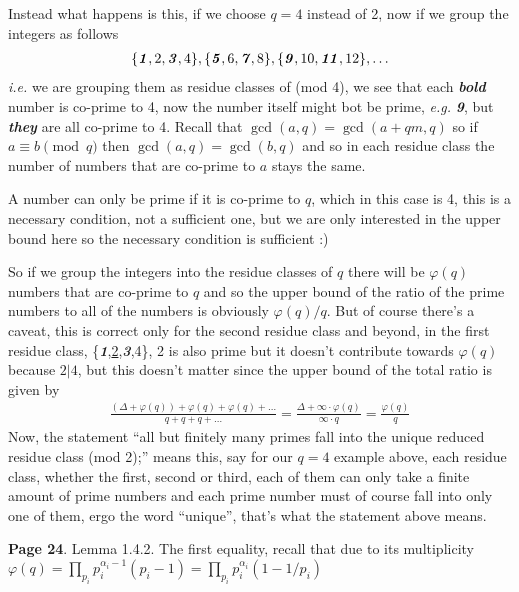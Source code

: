 \documentclass[aps,preprint,preprintnumbers,nofootinbib,showpacs,prd]{revtex4-1}
\newcommand{\ie}{{\it i.e.} }
\newcommand{\eg}{{\it e.g.} }
\newcommand{\nbea}{\begin{eqnarray*}}
\newcommand{\neea}{\end{eqnarray*}}
\begin{document}
Instead what happens is this, if we choose $q=4$ instead of 2, now if we group the integers as follows
%
\nbea
\{\textbf{\textit 1},2,\textbf{\textit 3},4\},\{\textbf{\textit 5},6,\textbf{\textit {7}},8\},\{\textbf{\textit 9},10,\textbf{\textit {11}},12\}, \dots
\neea
%
\ie we are grouping them as residue classes of (mod 4), we see that each \textbf{\textit{bold}} number is co-prime to 4, now the number itself might bot be prime, \eg \textbf{\textit{9}}, but \textbf{\textit{they}} are all co-prime to 4. Recall that $\gcd(a, q) = \gcd(a + qm, q)$ so if $a \equiv b \pmod{q}$ then $\gcd(a,q) = \gcd(b,q)$ and so in each residue class the number of numbers that are co-prime to $a$ stays the same.

A number can only be prime if it is co-prime to $q$, which in this case is 4, this is a necessary condition, not a sufficient one, but we are only interested in the upper bound here so the necessary condition is sufficient :)

So if we group the integers into the residue classes of $q$ there will be $\varphi(q)$ numbers that are co-prime to $q$ and so the upper bound of the ratio of the prime numbers to all of the numbers is obviously $\varphi(q)/q$. But of course there's a caveat, this is correct only for the second residue class and beyond, in the first residue class, \{\textbf{\textit 1},\underline{2},\textbf{\textit 3},4\}, 2 is also prime but it doesn't contribute towards $\varphi(q)$ because $2|4$, but this doesn't matter since the upper bound of the total ratio is given by
%
\nbea
\frac{(\Delta + \varphi(q)) + \varphi(q) + \varphi(q) + \dots }{q + q + q + \dots} = \frac{\Delta + \infty\cdot \varphi(q)}{\infty \cdot q} = \frac{\varphi(q)}{q}
\neea
%
Now, the statement ``all but finitely many primes fall into the unique reduced residue class (mod 2);'' means this, say for our $q=4$ example above, each residue class, whether the first, second or third, each of them can only take a finite amount of prime numbers and each prime number must of course fall into only one of them, ergo the word ``unique'', that's what the statement above means.

{\bf Page 24}. Lemma 1.4.2. The first equality, recall that due to its multiplicity $\varphi(q) = \prod_{p_i} p_i^{\alpha_i - 1}( p_i -1) = \prod_{p_i} p_i^{\alpha_i }( 1 -1/p_i)$
\end{document}
